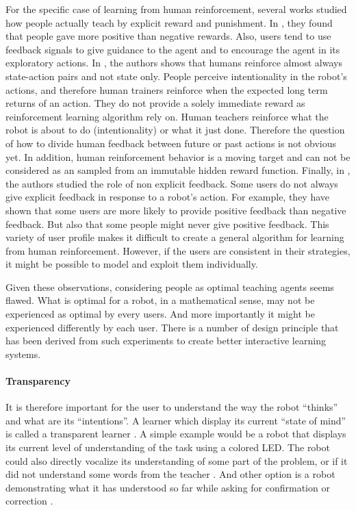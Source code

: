 For the specific case of learning from human reinforcement, several works studied how people actually teach by explicit reward and punishment.
In \cite{thomaz2006reinforcement}, they found that people gave more positive than negative rewards. Also, users tend to use feedback signals to give guidance to the agent and to encourage the agent in its exploratory actions. In \cite{knox2009design}, the authors shows that humans reinforce almost always state-action pairs and not state only. People perceive intentionality in the robot's actions, and therefore human trainers reinforce when the expected long term returns of an action. They do not provide a solely immediate reward as reinforcement learning algorithm rely on. Human teachers reinforce what the robot is about to do (intentionality) or what it just done. Therefore the question of how to divide human feedback between future or past actions is not obvious yet. In addition, human reinforcement behavior is a moving target and can not be considered as an sampled from an immutable hidden reward function. Finally, in \cite{loftinlearning}, the authors studied the role of non explicit feedback. Some users do not always give explicit feedback in response to a robot's action. For example, they have shown that some users are more likely to provide positive feedback than negative feedback. But also that some people might never give positive feedback. This variety of user profile makes it difficult to create a general algorithm for learning from human reinforcement. However, if the users are consistent in their strategies, it might be possible to model and exploit them individually. 

Given these observations, considering people as optimal teaching agents seems flawed. What is optimal for a robot, in a mathematical sense, may not be experienced as optimal by every users. And more importantly it might be experienced differently by each user. There is a number of design principle that has been derived from such experiments to create better interactive learning systems.

\paragraph{Transparency} It is therefore important for the user to understand the way the robot ``thinks'' and what are its ``intentions''. A learner which display its current ``state of mind'' is called a transparent learner \cite{thomaz2008teachable}. A simple example would be a robot that displays its current level of understanding of the task using a colored LED. The robot could also directly vocalize its understanding of some part of the problem, or if it did not understand some words from the teacher \cite{chao2010transparent}. And other option is a robot demonstrating what it has understood so far while asking for confirmation or correction \cite{cakmak2012designing}.

